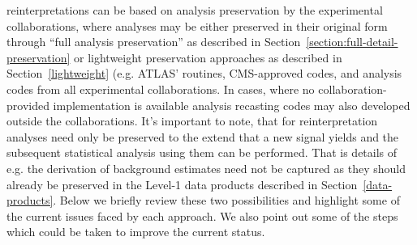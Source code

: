 \documentclass[11pt]{article}
\begin{document}
\Glspl{reinterpretation} can be based on \gls{analysis preservation} by the experimental collaborations, where analyses may be either preserved in their original form through ``full analysis preservation'' as described in Section~\ref{section:full-detail-preservation} or lightweight preservation approaches as described in Section~\ref{lightweight} (e.g. ATLAS' \simpleanalysis routines, \gls{CMS}-approved \madanalysis codes, and \rivet analysis codes from all experimental collaborations. In cases, where no collaboration-provided implementation is available analysis recasting codes may also developed outside the collaborations. It's important to note, that for reinterpretation analyses need only be preserved to the extend that a new signal yields and the subsequent statistical analysis using them can be performed. That is details of e.g. the derivation of background estimates need not be captured as they should already be preserved in the Level-1 data products described in Section~\ref{data-products}.
Below we briefly review these two possibilities and highlight some of the current issues faced by each approach. We also point out some of the steps which could be taken to improve the current status.







\end{document}
